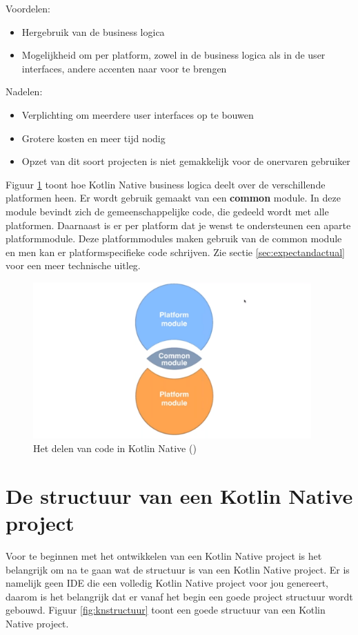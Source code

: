 Voordelen:
\begin{itemize}
	\item Hergebruik van de business logica
	\item Mogelijkheid om per platform, zowel in de business logica als in de user interfaces, andere accenten naar voor te brengen
\end{itemize}

Nadelen:
\begin{itemize}
	\item Verplichting om meerdere user interfaces op te bouwen
	\item Grotere kosten en meer tijd nodig
	\item Opzet van dit soort projecten is niet gemakkelijk voor de onervaren gebruiker
\end{itemize}

Figuur \ref{fig:sharingcode} toont hoe Kotlin Native business logica deelt over de verschillende platformen heen. Er wordt gebruik gemaakt van een \textbf{common} module. In deze module bevindt zich de gemeenschappelijke code, die gedeeld wordt met alle platformen. Daarnaast is er per platform dat je wenst te ondersteunen een aparte platformmodule. Deze platformmodules maken gebruik van de common module en men kan er platformspecifieke code schrijven. Zie sectie \ref{sec:expectandactual} voor een meer technische uitleg.

\begin{figure} [ht]
	\centering
	\includegraphics[width=0.95\textwidth]{img/sharingcode}
	\caption{Het delen van code in Kotlin Native (\cite{Developine})}
	\label{fig:sharingcode}
\end{figure}

\section{De structuur van een Kotlin Native project}
\label{sec:knstructure}
Voor te beginnen met het ontwikkelen van een Kotlin Native project is het belangrijk om na te gaan wat de structuur is van een Kotlin Native project. Er is namelijk geen IDE die een volledig Kotlin Native project voor jou genereert, daarom is het belangrijk dat er vanaf het begin een goede project structuur wordt gebouwd. Figuur \ref{fig:knstructuur} toont een goede structuur van een Kotlin Native project.

